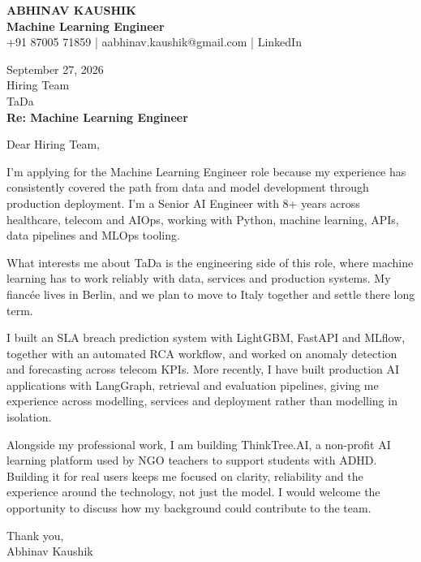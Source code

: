 \documentclass[10pt,a4paper]{article}
\begin{document}
\begin{center}
{\Large\bfseries ABHINAV KAUSHIK}\\[2pt]
{\bfseries Machine Learning Engineer}\\[2pt]
+91 87005 71859 \quad | \quad aabhinav.kaushik@gmail.com \quad | \quad LinkedIn
\end{center}
\vspace{8pt}
September 27, 2026\\[6pt]
Hiring Team\\
TaDa\\[4pt]
\textbf{Re: Machine Learning Engineer}

Dear Hiring Team,

I’m applying for the Machine Learning Engineer role because my experience has consistently covered the path from data and model development through production deployment. I’m a Senior AI Engineer with 8+ years across healthcare, telecom and AIOps, working with Python, machine learning, APIs, data pipelines and MLOps tooling.

What interests me about TaDa is the engineering side of this role, where machine learning has to work reliably with data, services and production systems. My fiancée lives in Berlin, and we plan to move to Italy together and settle there long term.

I built an SLA breach prediction system with LightGBM, FastAPI and MLflow, together with an automated RCA workflow, and worked on anomaly detection and forecasting across telecom KPIs. More recently, I have built production AI applications with LangGraph, retrieval and evaluation pipelines, giving me experience across modelling, services and deployment rather than modelling in isolation.

Alongside my professional work, I am building ThinkTree.AI, a non-profit AI learning platform used by NGO teachers to support students with ADHD. Building it for real users keeps me focused on clarity, reliability and the experience around the technology, not just the model. I would welcome the opportunity to discuss how my background could contribute to the team.

Thank you,\\
Abhinav Kaushik
\end{document}
